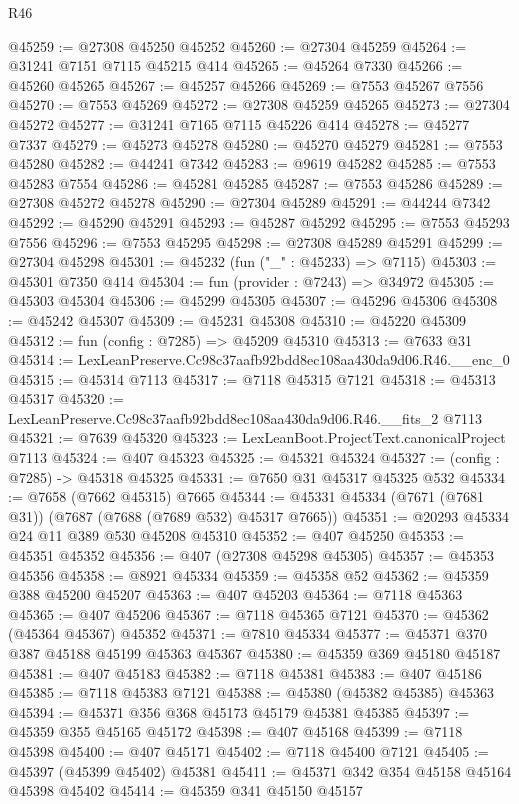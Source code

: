 \begin{lexlean}{R46}
\begin{coremodule}
@45259 := @27308 @45250 @45252
@45260 := @27304 @45259
@45264 := @31241 @7151 @7115 @45215 @414
@45265 := @45264 @7330
@45266 := @45260 @45265
@45267 := @45257 @45266
@45269 := @7553 @45267 @7556
@45270 := @7553 @45269
@45272 := @27308 @45259 @45265
@45273 := @27304 @45272
@45277 := @31241 @7165 @7115 @45226 @414
@45278 := @45277 @7337
@45279 := @45273 @45278
@45280 := @45270 @45279
@45281 := @7553 @45280
@45282 := @44241 @7342
@45283 := @9619 @45282
@45285 := @7553 @45283 @7554
@45286 := @45281 @45285
@45287 := @7553 @45286
@45289 := @27308 @45272 @45278
@45290 := @27304 @45289
@45291 := @44244 @7342
@45292 := @45290 @45291
@45293 := @45287 @45292
@45295 := @7553 @45293 @7556
@45296 := @7553 @45295
@45298 := @27308 @45289 @45291
@45299 := @27304 @45298
@45301 := @45232 (fun ("_" : @45233) => @7115)
@45303 := @45301 @7350 @414
@45304 := fun (provider : @7243) => @34972
@45305 := @45303 @45304
@45306 := @45299 @45305
@45307 := @45296 @45306
@45308 := @45242 @45307
@45309 := @45231 @45308
@45310 := @45220 @45309
@45312 := fun (config : @7285) => @45209 @45310
@45313 := @7633 @31
@45314 := LexLeanPreserve.Cc98c37aafb92bdd8ec108aa430da9d06.R46.__enc_0
@45315 := @45314 @7113
@45317 := @7118 @45315 @7121
@45318 := @45313 @45317
@45320 := LexLeanPreserve.Cc98c37aafb92bdd8ec108aa430da9d06.R46.__fits_2 @7113
@45321 := @7639 @45320
@45323 := LexLeanBoot.ProjectText.canonicalProject @7113
@45324 := @407 @45323
@45325 := @45321 @45324
@45327 := (config : @7285) -> @45318 @45325
@45331 := @7650 @31 @45317 @45325 @532
@45334 := @7658 (@7662 @45315) @7665
@45344 := @45331 @45334 (@7671 (@7681 @31)) (@7687 (@7688 (@7689 @532) @45317 @7665))
@45351 := @20293 @45334 @24 @11 @389 @530 @45208 @45310
@45352 := @407 @45250
@45353 := @45351 @45352
@45356 := @407 (@27308 @45298 @45305)
@45357 := @45353 @45356
@45358 := @8921 @45334
@45359 := @45358 @52
@45362 := @45359 @388 @45200 @45207
@45363 := @407 @45203
@45364 := @7118 @45363
@45365 := @407 @45206
@45367 := @7118 @45365 @7121
@45370 := @45362 (@45364 @45367) @45352
@45371 := @7810 @45334
@45377 := @45371 @370 @387 @45188 @45199 @45363 @45367
@45380 := @45359 @369 @45180 @45187
@45381 := @407 @45183
@45382 := @7118 @45381
@45383 := @407 @45186
@45385 := @7118 @45383 @7121
@45388 := @45380 (@45382 @45385) @45363
@45394 := @45371 @356 @368 @45173 @45179 @45381 @45385
@45397 := @45359 @355 @45165 @45172
@45398 := @407 @45168
@45399 := @7118 @45398
@45400 := @407 @45171
@45402 := @7118 @45400 @7121
@45405 := @45397 (@45399 @45402) @45381
@45411 := @45371 @342 @354 @45158 @45164 @45398 @45402
@45414 := @45359 @341 @45150 @45157

\end{coremodule}
\end{lexlean}
